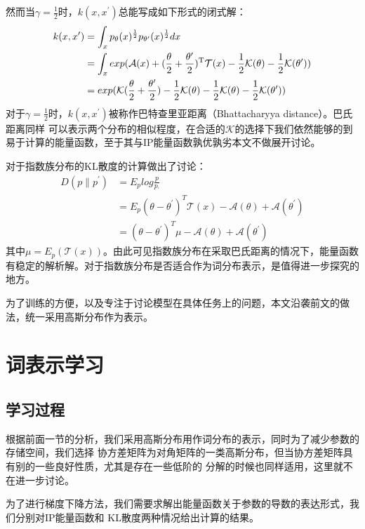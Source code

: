 \documentclass[a4paper,13pt]{article}
\begin{document}
\begin{spacing}{1.5}
然而当$\gamma=\frac{1}{2}$时，$k(x,x^{\prime{}})$总能写成如下形式的闭式解：
\begin{align*}
k(x,x^{\prime{}})&=\int_x p_\theta(x)^{\frac{1}{2}} p_{\theta^{\prime{}}}(x)^{\frac{1}{2}}dx \\
&=\int_x exp(\mathcal{A}(x)+(\frac{\theta}{2}+\frac{\theta^{\prime{}}}{2})^{\rm T}\mathcal{T}(x)-\frac{1}{2}\mathcal{K}(\theta)-\frac{1}{2}\mathcal{K}(\theta^{\prime{}})) \\
&=exp(\mathcal{K}(\frac{\theta}{2}+\frac{\theta^{\prime{}}}{2})-\frac{1}{2}\mathcal{K}(\theta)-\frac{1}{2}\mathcal{K}(\theta)-\frac{1}{2}\mathcal{K}(\theta^{\prime{}})) 
\end{align*}
对于$\gamma=\frac{1}{2}$时，$k(x,x^{\prime{}})$被称作巴特查里亚距离（Bhattacharyya distance）。巴氏距离同样
可以表示两个分布的相似程度，在合适的$\mathcal{K}$的选择下我们依然能够的到易于计算的能量函数，至于其与IP能量函数孰优孰劣本文不做展开讨论。

\cite{jordan2003introduction}对于指数族分布的KL散度的计算做出了讨论：
\begin{align*}
D(p \parallel p^{\prime{}}) &= E_p log \frac{p}{p_{\prime{}}} \\
&=E_p (\theta - \theta^{\prime{}})^{T} \mathcal{T}(x) - \mathcal{A}(\theta) + \mathcal{A}(\theta^{\prime{}}) \\
&= (\theta - \theta^{\prime{}})^{T} \mu - \mathcal{A}(\theta) + \mathcal{A}(\theta^{\prime{}})
\end{align*}
其中$\mu = E_p (\mathcal{T}(x))$。由此可见指数族分布在采取巴氏距离的情况下，能量函数有稳定的解析解。对于指数族分布是否适合作为词分布表示，是值得进一步探究的地方。

为了训练的方便，以及专注于讨论模型在具体任务上的问题，本文沿袭前文的做法，统一采用高斯分布作为表示。

\section{词表示学习}

\subsection{学习过程}
根据前面一节的分析，我们采用高斯分布用作词分布的表示，同时为了减少参数的存储空间，我们选择
协方差矩阵为对角矩阵的一类高斯分布，但当协方差矩阵具有别的一些良好性质，尤其是存在一些低阶的
分解的时候也同样适用，这里就不在进一步讨论。

为了进行梯度下降方法，我们需要求解出能量函数关于参数的导数的表达形式，我们分别对IP能量函数和
KL散度两种情况给出计算的结果。


\end{spacing}
\end{document}
